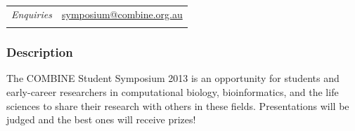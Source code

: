 \documentclass[12pt,]{article}
\begin{document}
\begin{longtable}[c]{@{}ll@{}}


\begin{minipage}[t]{0.30\columnwidth}\raggedright
\emph{Enquiries}
\end{minipage} & \begin{minipage}[t]{0.70\columnwidth}\raggedright
\href{mailto:symposium@combine.org.au}{symposium@combine.org.au}
\end{minipage}
\\\noalign{\medskip}
\hline
\end{longtable}



\subsubsection{Description}

The COMBINE Student Symposium 2013 is an opportunity for students and
early-career researchers in computational biology, bioinformatics, and the life
sciences to share their research with others in these fields. Presentations
will be judged and the best ones will receive prizes!
\end{document}
